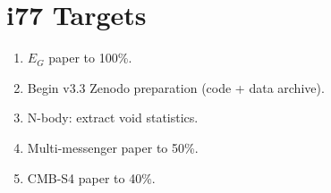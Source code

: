 \documentclass[11pt,a4paper]{article}
\begin{document}
\section{i77 Targets}

\begin{enumerate}[nosep]
\item $E_G$ paper to 100\%.
\item Begin v3.3 Zenodo preparation (code + data archive).
\item N-body: extract void statistics.
\item Multi-messenger paper to 50\%.
\item CMB-S4 paper to 40\%.
\end{enumerate}
\end{document}

